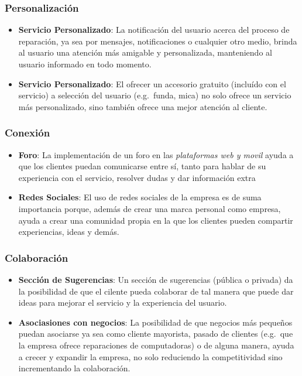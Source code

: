 \subsubsection{Personalización}

\begin{itemize}
	\item \textbf{Servicio Personalizado}: La notificación del usuario acerca del proceso
	      de reparación, ya sea por mensajes, notificaciones o cualquier otro medio,
	      brinda al usuario una atención más amigable y personalizada, manteniendo al usuario
	      informado en todo momento.

	\item \textbf{Servicio Personalizado}: El ofrecer un accesorio gratuito (incluído
	      con el servicio) a selección del usuario (e.g.~funda, mica) no solo ofrece un
	      servicio más personalizado, sino también ofrece una mejor atención al
	      cliente.
\end{itemize}

\subsubsection{Conexión}

\begin{itemize}
	\item \textbf{Foro}: La implementación de un foro en las \emph{plataformas web
		      y movil} ayuda a que los clientes puedan comunicarse entre sí, tanto para hablar
	      de su experiencia con el servicio, resolver dudas y dar información extra

	\item \textbf{Redes Sociales}: El uso de redes sociales de la empresa es de suma
	      importancia porque, además de crear una marca personal como empresa, ayuda a
	      crear una comunidad propia en la que los clientes pueden compartir experiencias,
	      ideas y demás.
\end{itemize}

\subsubsection{Colaboración}

\begin{itemize}
	\item \textbf{Sección de Sugerencias}: Un sección de sugerencias (pública o
	      privada) da la posibilidad de que el cilente pueda colaborar de tal manera que
	      puede dar ideas para mejorar el servicio y la experiencia del usuario.

	\item \textbf{Asociasiones con negocios}: La posibilidad de que negocios más pequeños
	      puedan asociarse ya sea como cliente mayorista, pasado de clientes (e.g.~que
	      la empresa ofrece reparaciones de computadoras) o de alguna manera, ayuda a
	      crecer y expandir la empresa, no solo reduciendo la competitividad sino incrementando
	      la colaboración.
\end{itemize}

